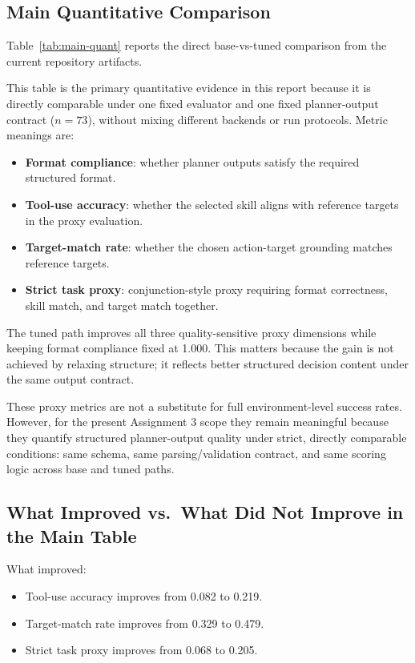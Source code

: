 \documentclass{article}
\begin{document}
\subsection{Main Quantitative Comparison}
Table~\ref{tab:main-quant} reports the direct base-vs-tuned comparison from the current repository artifacts.


This table is the primary quantitative evidence in this report because it is directly comparable under one fixed evaluator and one fixed planner-output contract ($n=73$), without mixing different backends or run protocols. Metric meanings are:
\begin{itemize}[leftmargin=*]
  \item \textbf{Format compliance}: whether planner outputs satisfy the required structured format.
  \item \textbf{Tool-use accuracy}: whether the selected skill aligns with reference targets in the proxy evaluation.
  \item \textbf{Target-match rate}: whether the chosen action-target grounding matches reference targets.
  \item \textbf{Strict task proxy}: conjunction-style proxy requiring format correctness, skill match, and target match together.
\end{itemize}

The tuned path improves all three quality-sensitive proxy dimensions while keeping format compliance fixed at 1.000. This matters because the gain is not achieved by relaxing structure; it reflects better structured decision content under the same output contract.

These proxy metrics are not a substitute for full environment-level success rates. However, for the present Assignment 3 scope they remain meaningful because they quantify structured planner-output quality under strict, directly comparable conditions: same schema, same parsing/validation contract, and same scoring logic across base and tuned paths.

\subsection{What Improved vs.\ What Did Not Improve in the Main Table}
What improved:
\begin{itemize}[leftmargin=*]
  \item Tool-use accuracy improves from 0.082 to 0.219.
  \item Target-match rate improves from 0.329 to 0.479.
  \item Strict task proxy improves from 0.068 to 0.205.
\end{itemize}
\end{document}
